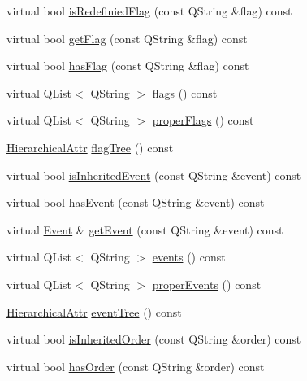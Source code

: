\begin{DoxyCompactItemize}
\item 
virtual bool \hyperlink{class_inheritable_object_ab691081c80168648c19b60061c1fa148}{is\-Redefinied\-Flag} (const \-Q\-String \&flag) const 
\item 
virtual bool \hyperlink{class_inheritable_object_a2982062433ef52c22a669e29dbc42e65}{get\-Flag} (const \-Q\-String \&flag) const 
\item 
virtual bool \hyperlink{class_inheritable_object_a3c441caeca4fdc82fb1978595561f101}{has\-Flag} (const \-Q\-String \&flag) const 
\item 
virtual \-Q\-List$<$ \-Q\-String $>$ \hyperlink{class_inheritable_object_a2014359fb2260eec0804a0e7be0a6c6d}{flags} () const 
\item 
virtual \-Q\-List$<$ \-Q\-String $>$ \hyperlink{class_inheritable_object_a2b0d98c6f8f69698629a4e4c94c85ba4}{proper\-Flags} () const 
\item 
\hyperlink{gameobject_8h_a2679b210263ad72f002dee6909ea222b}{\-Hierarchical\-Attr} \hyperlink{class_inheritable_object_a1f5e307cffd3b9d3fc4c4d00079361f7}{flag\-Tree} () const 
\item 
virtual bool \hyperlink{class_inheritable_object_a8570cbda77efca0b3a8349617f13be3a}{is\-Inherited\-Event} (const \-Q\-String \&event) const 
\item 
virtual bool \hyperlink{class_inheritable_object_a2afb2fbdfad6ecc893038fccbb2d922c}{has\-Event} (const \-Q\-String \&event) const 
\item 
virtual \hyperlink{class_event}{\-Event} \& \hyperlink{class_inheritable_object_abb011de0e529d57bf88160ed6761e0fa}{get\-Event} (const \-Q\-String \&event) const 
\item 
virtual \-Q\-List$<$ \-Q\-String $>$ \hyperlink{class_inheritable_object_af8ff334cb226823e943565509f2f7ac5}{events} () const 
\item 
virtual \-Q\-List$<$ \-Q\-String $>$ \hyperlink{class_inheritable_object_a67a4f5c4e0bf39ffdaf7611e387c1dec}{proper\-Events} () const 
\item 
\hyperlink{gameobject_8h_a2679b210263ad72f002dee6909ea222b}{\-Hierarchical\-Attr} \hyperlink{class_inheritable_object_a5976b3fd18b8ebe7284a61642ab59f5a}{event\-Tree} () const 
\item 
virtual bool \hyperlink{class_inheritable_object_a22092812ca2d4ea9f02baae132204a68}{is\-Inherited\-Order} (const \-Q\-String \&order) const 
\item 
virtual bool \hyperlink{class_inheritable_object_a1c833c8c21936e923364e8f0933c2197}{has\-Order} (const \-Q\-String \&order) const 

\end{DoxyCompactItemize}
